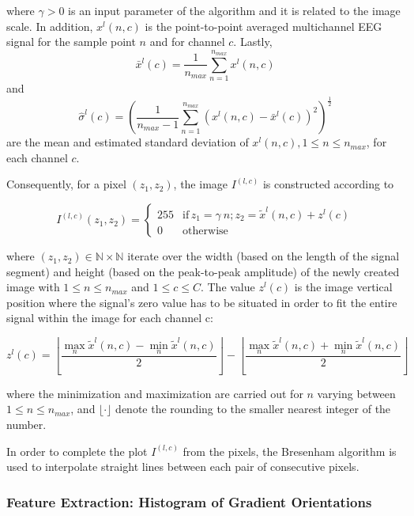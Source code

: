 \documentclass[utf8]{frontiersSCNS} %
\begin{document}
\noindent where $\gamma > 0$ is an input parameter of the algorithm and  it is related to the image scale. In addition, $ x^l(n,c) $ is the point-to-point averaged multichannel EEG signal for the sample point $n$ and for channel $c$. Lastly, $$\bar{x}^l(c) =\frac{1}{n_{max}}\sum_{n=1}^{n_{max}}x^l(n,c)$$ and $$ \hat{\sigma}^l(c) = (\frac{1}{n_{max}-1}\sum_{n=1}^{n_{max}}(x^l(n,c)-\bar{x}^l(c))^2 )^{\frac{1}{2}}$$ are the mean and estimated standard deviation of $x^l(n,c), 1 \leq n \leq n_{max}$, for each channel $c$.

Consequently, for a pixel $(z_1,z_2)$, the image $I^{(l,c)}$ is constructed according to

\begin{equation}
I^{(l,c)}(z_1,z_2) = \left\{ \begin{array}{rl}
255 & \text{if} \,  z_1 = \gamma \  n; \! z_2 = \tilde{x}^l(n,c) + z^l(c) \\
0   & \mbox{otherwise}
\end{array}\right.
\label{eq:images}
\end{equation}

\noindent where $ (z_1,z_2) \in \mathbb{N} \times \mathbb{N}$ iterate over the width (based on the length of the signal segment) and height (based on the peak-to-peak amplitude) of the newly created image with $1 \leq n \leq n_{max}$ and $1 \leq c \leq C$.  The value $z^l(c)$ is the image vertical position where the signal's zero value has to be situated in order to fit the entire signal within the image for each channel c:

\begin{equation}
z^l(c) = \left \lfloor{ \frac{\max_{n} \tilde{x}^l(n,c)  - \min_{n} \tilde{x}^l(n,c) }{2} }\right \rfloor -   \left \lfloor{ \frac{\max_{n} \tilde{x}^l(n,c)  + \min_{n} \tilde{x}^l(n,c)}{ 2} }\right \rfloor
\label{eq:zerolevel}
\end{equation}

\noindent where the minimization and maximization are carried out for $n$ varying between ${1 \leq n\leq n_{max}}$, and $ \lfloor \cdot  \rfloor $ denote the rounding to the smaller nearest integer of the number.
  
In order to complete the plot $I^{(l,c)}$ from the pixels, the Bresenham \citep{Bresenham1965,Ramele2016} algorithm is used to interpolate straight lines between each pair of  consecutive pixels.


\subsubsection{Feature Extraction: Histogram of Gradient Orientations}
\label{SIFT}
\end{document}
